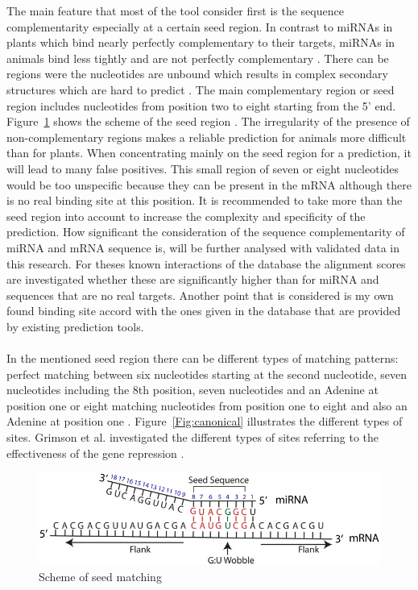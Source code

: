 \documentclass[12pt]{article}
\begin{document}
The main feature that most of the tool consider first is the sequence complementarity especially at a certain seed region. In contrast to miRNAs in plants which bind nearly perfectly complementary to their targets, miRNAs in animals bind less tightly and are not perfectly complementary \cite{Rhoades}. There can be regions were the nucleotides are unbound which results in complex secondary structures which are hard to predict \cite{Rehmsmeier}. The main complementary region or seed region includes nucleotides from position two to eight starting from the 5' end. Figure~\ref{seed} shows the scheme of the seed region \cite{Peterson}. 
The irregularity of the presence of non-complementary regions makes a reliable prediction for animals more difficult than for plants. When concentrating mainly on the seed region for a prediction, it will lead to many false positives. This small region of seven or eight nucleotides would be too unspecific because they can be present in the mRNA although there is no real binding site at this position. It is recommended to take more than the seed region into account to increase the complexity and specificity of the prediction. How significant the consideration of the sequence complementarity of miRNA and mRNA sequence is, will be further analysed with validated data in this research. For theses known interactions of the database the alignment scores are investigated whether these are significantly higher than for miRNA and sequences that are no real targets. Another point that is considered is my own found binding site accord with the ones given in the database that are provided by existing prediction tools. \\\\
In the mentioned seed region there can be different types of matching patterns: perfect matching between six nucleotides starting at the second nucleotide, seven nucleotides including the 8th position, seven nucleotides and an Adenine at position one or eight matching nucleotides from position one to eight and also an Adenine at position one \cite{Grimson}. Figure~\ref{Fig:canonical} illustrates the different types of sites. Grimson et al. investigated the different types of sites referring to the effectiveness of the gene repression \cite{Grimson}. \\


\begin{figure}[h]
\centering
\includegraphics[scale=2.8]{results/seedmatching.png} 
\caption{Scheme of seed matching}
\label{seed}
\end{figure}
\end{document}
